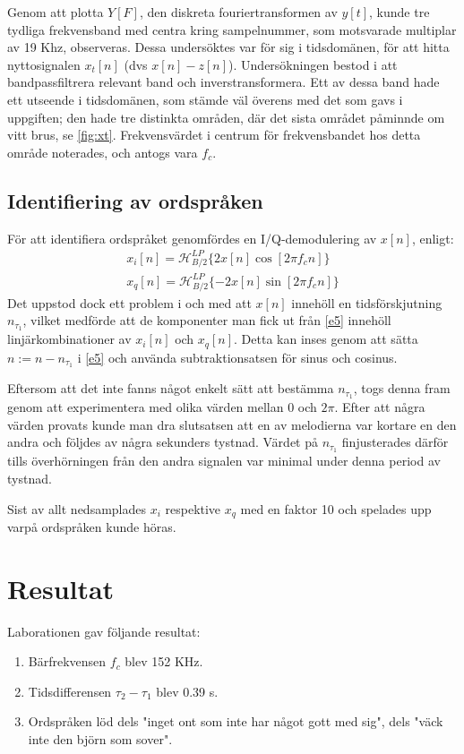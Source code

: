 \documentclass[10pt,twocolumn]{article}
\begin{document}
Genom att plotta $Y[F]$, den diskreta fouriertransformen av $y[t]$, kunde tre tydliga frekvensband med
centra kring sampelnummer, som motsvarade multiplar av 19 Khz, observeras.
Dessa undersöktes var för sig i tidsdomänen, för att hitta nyttosignalen $x_t[n]$ (dvs $x[n] - z[n]$).
Undersökningen bestod i att bandpassfiltrera relevant band och inverstransformera. Ett av
dessa band hade ett utseende i tidsdomänen, som stämde väl överens med det som gavs i uppgiften; den
hade tre distinkta områden, där det sista området påminnde om vitt brus, se \ref{fig:xt}. Frekvensvärdet i centrum för
frekvensbandet hos detta område noterades, och antogs vara $f_c$.

\subsection{Identifiering av ordspråken}

För att identifiera ordspråket genomfördes en I/Q-demodulering av $x[n]$, enligt:
\begin{multline}
    x_i[n] = \mathcal{H}_{B/2}^{LP} \{ 2 x[n] \cos[2 \pi f_c n] \} \\
    x_q[n] = \mathcal{H}_{B/2}^{LP} \{ -2 x[n] \sin[2 \pi f_c n] \}
    \label{e5}
\end{multline}
Det uppstod dock ett problem i och med att $x[n]$ innehöll en tidsförskjutning $n_{\tau_1}$,
vilket medförde att de komponenter man fick ut från \ref{e5} innehöll
linjärkombinationer av $x_i[n]$ och $x_q[n]$. Detta kan inses genom att sätta $n := n - n_{\tau_1}$
i \ref{e5} och använda subtraktionsatsen för sinus och cosinus.

Eftersom att det inte fanns något enkelt sätt att bestämma $n_{\tau_1}$, togs denna fram genom
att experimentera med olika värden mellan $0$ och $2 \pi$. Efter att några värden provats
kunde man dra slutsatsen att en av melodierna var kortare en den andra och följdes av några
sekunders tystnad. Värdet på $n_{\tau_1}$ finjusterades därför tills överhörningen från den
andra signalen var minimal under denna period av tystnad.

Sist av allt nedsamplades $x_i$ respektive $x_q$ med en faktor 10 och spelades upp varpå
ordspråken kunde höras.
\section{Resultat}

Laborationen gav följande resultat:
\begin{enumerate}
\item Bärfrekvensen $f_c$ blev 152 KHz. 
\item Tidsdifferensen $\tau_2 - \tau_1$ blev 0.39 s.
\item Ordspråken löd dels "inget ont som inte har något gott med sig", dels "väck inte den björn som sover".
\end{enumerate}
\end{document}

